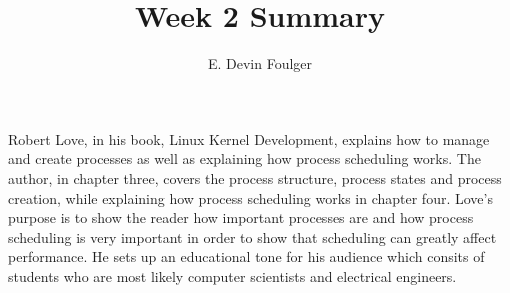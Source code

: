 \documentclass[journal, 10pt]{IEEEtran}
\def\name{E. Devin Foulger}
\begin{document}
\title{Week 2 Summary}
\author{\name}
\date{} %

\maketitle

Robert Love, in his book, Linux Kernel Development, explains how to manage and create processes as well as 
explaining how process scheduling works. The author, in chapter three, covers the process structure, process states 
and process creation, while explaining how process scheduling works in chapter four. Love's purpose is to show the 
reader how important processes are and how process scheduling is very important in order to show that scheduling can
greatly affect performance. He sets up an educational tone for his audience which consits of students who are most 
likely computer scientists and electrical engineers.
\end{document}
